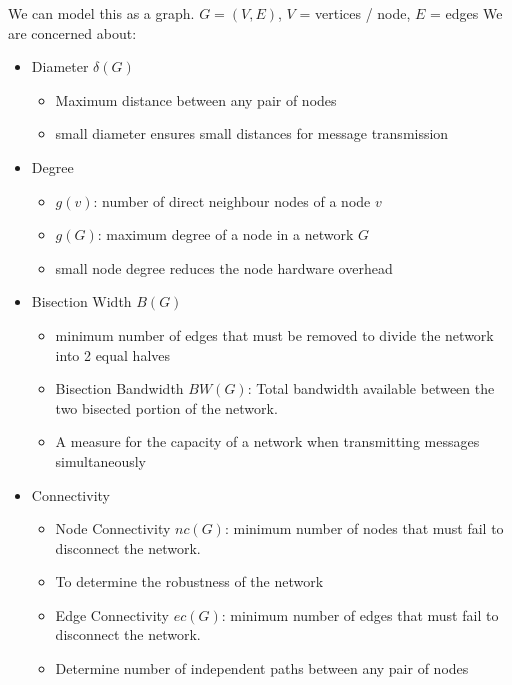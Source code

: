 \documentclass{article}
\begin{document}
We can model this as a graph. $G = \left( V, E \right)$, $V$ = vertices / node, $E$ = edges
We are concerned about:
\begin{itemize}
    \item Diameter $\delta \left( G \right)$
          \begin{itemize}
              \item Maximum distance between any pair of nodes
              \item small diameter ensures small distances for message transmission
          \end{itemize}
    \item Degree
          \begin{itemize}
              \item $g\left( v \right)$: number of direct neighbour nodes of a node $v$
              \item $g\left( G \right)$: maximum degree of a node in a network $G$
              \item small node degree reduces the node hardware overhead
          \end{itemize}
    \item Bisection Width $B \left( G \right)$
          \begin{itemize}
              \item minimum number of edges that must be removed to divide the network into 2 equal halves
              \item Bisection Bandwidth $BW\left( G \right)$: Total bandwidth available between the two bisected portion of the network.
              \item A measure for the capacity of a network when transmitting messages simultaneously
          \end{itemize}
    \item Connectivity
          \begin{itemize}
              \item Node Connectivity $nc \left( G \right)$: minimum number of nodes that must fail to disconnect the network.
              \item To determine the robustness of the network
              \item Edge Connectivity $ec \left( G \right) $: minimum number of edges that must fail to disconnect the network.
              \item Determine number of independent paths between any pair of nodes
          \end{itemize}
\end{itemize}
\end{document}
